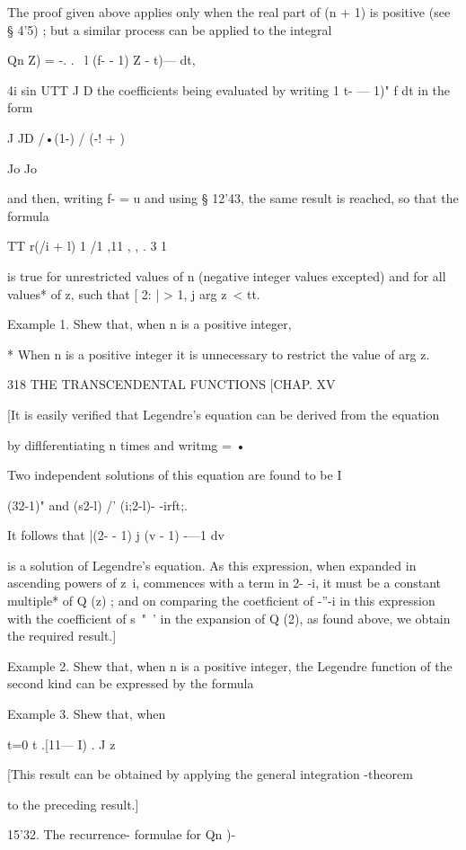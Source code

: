 {{The proof given above applies only when the real part of (n + 1) is
positive (see § 4'5) ; but a similar process can be applied to the
integral

Qn Z) = -. . \ l (f- - 1) Z - t)— dt,

4i sin UTT J D the coefficients being evaluated by writing 1 t- — 1)"
f dt in the form

J JD /•(1-) / (-! + )

Jo Jo

and then, writing f- = u and using § 12'43, the same result is
reached, so that the formula

TT r(/i + l) 1 /1 ,11 , , . 3 1

is true for unrestricted values of n (negative integer values
excepted) and for all values* of z, such that [ 2: | > 1, j arg z\ <
tt.

Example 1. Shew that, when n is a positive integer,

* When n is a positive integer it is unnecessary to restrict the value
of arg z.

318 THE TRANSCENDENTAL FUNCTIONS [CHAP. XV

[It is easily verified that Legendre's equation can be derived from
the equation

by diflferentiating n times and writmg = •

Two independent solutions of this equation are found to be I

(32-1)" and (s2-l) /' (i;2-l)- -irft;.

It follows that |(2- - 1) j (v - 1) -—1 dv

is a solution of Legendre's equation. As this expression, when
expanded in ascending powers of z~i, commences with a term in 2- -i,
it must be a constant multiple* of Q (z) ; and on comparing the
coetficient of -''-i in this expression with the coefficient of s~"~'
in the expansion of Q (2), as found above, we obtain the required
result.]

Example 2. Shew that, when n is a positive integer, the Legendre
function of the second kind can be expressed by the formula

Example 3. Shew that, when %

t=0 t .[11— I) . J z

[This result can be obtained by applying the general integration
-theorem

to the preceding result.]

15'32. The recurrence- formulae for Qn )-

}}
